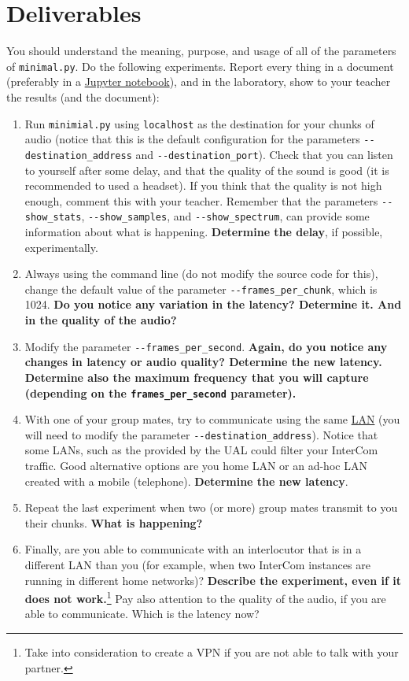 \section{Deliverables}

You should understand the meaning, purpose, and usage of all of the
parameters of \texttt{minimal.py}. Do the following
experiments. Report every thing in a document (preferably in a
\href{https://jupyter.org/}{Jupyter notebook}), and in the laboratory,
show to your teacher the results (and the document):

\begin{enumerate}
\item Run \texttt{minimial.py} using \texttt{localhost} as the
  destination for your chunks of audio (notice that this is the
  default configuration for the parameters
  \verb|--destination_address| and \verb|--destination_port|). Check
  that you can listen to yourself after some delay, and that the
  quality of the sound is good (it is recommended to used a
  headset). If you think that the quality is not high enough, comment
  this with your teacher. Remember that the parameters
  \verb|--show_stats|, \verb|--show_samples|, and
  \verb|--show_spectrum|, can provide some information about what is
  happening. \textbf{Determine the delay}, if possible,
  experimentally.
\item Always using the command line (do not modify the source code for
  this), change the default value of the parameter
  \verb|--frames_per_chunk|, which is 1024. \textbf{Do you notice any
    variation in the latency? Determine it. And in the quality of the
    audio?}
\item Modify the parameter \verb|--frames_per_second|. \textbf{Again,
  do you notice any changes in latency or audio quality? Determine the
  new latency. Determine also the maximum frequency that you will
  capture (depending on the \texttt{frames\_per\_second} parameter).}
\item With one of your group mates, try to communicate using the same
  \href{https://en.wikipedia.org/wiki/Local_area_network}{LAN} (you
  will need to modify the parameter
  \verb|--destination_address|). Notice that some LANs, such as the
  provided by the UAL could filter your InterCom traffic. Good
  alternative options are you home LAN or an ad-hoc LAN created
  with a mobile (telephone). \textbf{Determine the new latency}.
\item Repeat the last experiment when two (or more) group mates
  transmit to you their chunks. \textbf{What is happening?}
\item Finally, are you able to communicate with an interlocutor that
  is in a different LAN than you (for example, when two InterCom
  instances are running in different home networks)? \textbf{Describe
    the experiment, even if it does not work.}\footnote{Take into
    consideration to create a VPN if you are not able to talk with
    your partner.} Pay also attention to the quality of the audio, if
  you are able to communicate. Which is the latency now?
\end{enumerate}

